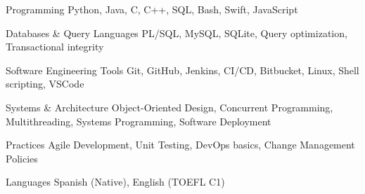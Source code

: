 
\begin{cvskills}

  \cvskill
    {Programming} %
    {Python, Java, C, C++, SQL, Bash, Swift, JavaScript} %

  \cvskill
    {Databases \& Query Languages}
    {PL/SQL, MySQL, SQLite, Query optimization, Transactional integrity}

  \cvskill
    {Software Engineering Tools}
    {Git, GitHub, Jenkins, CI/CD, Bitbucket, Linux, Shell scripting, VSCode}

  \cvskill
    {Systems \& Architecture}
    {Object-Oriented Design, Concurrent Programming, Multithreading, Systems Programming, Software Deployment}

  \cvskill
    {Practices}
    {Agile Development, Unit Testing, DevOps basics, Change Management Policies}

  \cvskill
    {Languages}
    {Spanish (Native), English (TOEFL C1)}

\end{cvskills}
